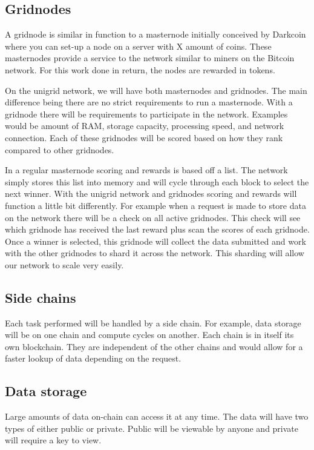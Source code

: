 \documentclass[12pt]{article}
\begin{document}
\subsection*{Gridnodes}

A gridnode is similar in function to a masternode initially conceived by Darkcoin where you can set-up a node on a server with X amount of coins. These masternodes provide a service to the network similar to miners on the Bitcoin network. For this work done in return, the nodes are rewarded in tokens.

On the unigrid network, we will have both masternodes and gridnodes. The main difference being there are no strict requirements to run a masternode. With a gridnode there will be requirements to participate in the network. Examples would be amount of RAM, storage capacity, processing speed, and network connection. Each of these gridnodes will be scored based on how they rank compared to other gridnodes.

In a regular masternode scoring and rewards is based off a list. The network simply stores this list into memory and will cycle through each block to select the next winner. With the unigrid network and gridnodes scoring and rewards will function a little bit differently. For example when a request is made to store data on the network there will be a check on all active gridnodes. This check will see which gridnode has received the last reward plus scan the scores of each gridnode. Once a winner is selected, this gridnode will collect the data submitted and work with the other gridnodes to shard it across the network. This sharding will allow our network to scale very easily.


\subsection*{Side chains}
Each task performed will be handled by a side chain. For example, data storage will be on one chain and compute cycles on another. Each chain is in itself its own blockchain. They are independent of the other chains and would allow for a faster lookup of data depending on the request.

\subsection*{Data storage}
Large amounts of data on-chain can access it at any time. The data will have two types of either public or private. Public will be viewable by anyone and private will require a key to view.
\end{document}
